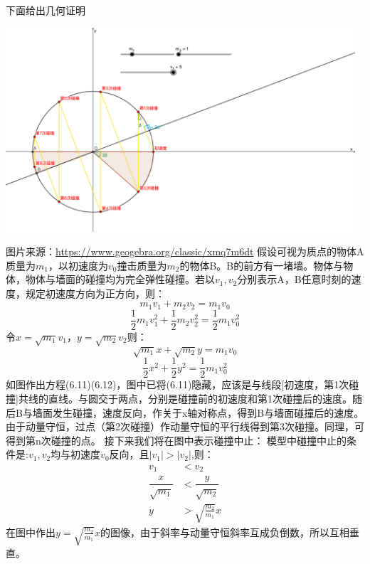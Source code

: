 \begin{problemset}
	下面给出几何证明
	\begin{center}
		\includegraphics[width=13cm]{media/62.png}
	\end{center}
	图片来源：\href{https://www.geogebra.org/classic/xmq7m6dt}{https://www.geogebra.org/classic/xmq7m6dt}
	假设可视为质点的物体A质量为$m_1$，以初速度为$v_0$撞击质量为$m_2$的物体B。B的前方有一堵墙。物体与物体，物体与墙面的碰撞均为完全弹性碰撞。若以$v_1,v_2$分别表示A，B任意时刻的速度，规定初速度方向为正方向，则：
	\begin{equation}
		m_1v_1+m_2v_2=m_1v_0
	\end{equation}
	\begin{equation}
		\frac{1}{2}m_1v_1^2+\frac{1}{2}m_2v_2^2=\frac{1}{2}m_1v_0^2
	\end{equation}
	令$x=\sqrt{m_1}v_1$，$y=\sqrt{m_2}v_2$则：
	\begin{equation}
		\sqrt{m_1}x+\sqrt{m_2}y=m_1v_0
	\end{equation}
	\begin{equation}
		\frac{1}{2}x^2+\frac{1}{2}y^2=\frac{1}{2}m_1v_0^2
	\end{equation}
	如图作出方程(6.11)(6.12)，图中已将(6.11)隐藏，应该是与线段[初速度，第1次碰撞]共线的直线。与圆交于两点，分别是碰撞前的初速度和第1次碰撞后的速度。随后B与墙面发生碰撞，速度反向，作关于x轴对称点，得到B与墙面碰撞后的速度。由于动量守恒，过点（第2次碰撞）作动量守恒的平行线得到第3次碰撞。同理，可得到第n次碰撞的点。
	\newpage
	接下来我们将在图中表示碰撞中止：
	模型中碰撞中止的条件是:$v_1,v_2$均与初速度$v_0$反向，且$\vert v_1\vert >\vert v_2\vert$,则：
	\begin{align*}
		v_1&<v_2\\
		\dfrac{x}{\sqrt{m_1}}&<\dfrac{y}{\sqrt{m_2}}\\
		y&>\sqrt{\frac{m_2}{m_1}}x
	\end{align*}
	在图中作出$y=\sqrt{\frac{m_2}{m_1}}x$的图像，由于斜率与动量守恒斜率互成负倒数，所以互相垂直。


\end{problemset}

